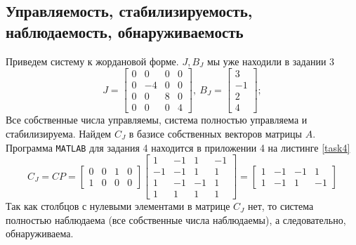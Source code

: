 \documentclass[a4paper, 12pt]{article}
\begin{document}
    \subsection{Управляемость, стабилизируемость, наблюдаемость, обнаруживаемость}
    Приведем систему к жордановой форме. $J,B_J$ мы уже находили в задании 3
    $$
    J=\begin{bmatrix}
        0     &0     &0     &0\\
        0    &-4     &0     &0\\
        0     &0     &8     &0\\
        0     &0     &0     &4
        \end{bmatrix},\ B_J=\begin{bmatrix}
            3\\
            -1\\
             2\\
             4
        \end{bmatrix};
    $$
    Все собственные числа управляемы, система полностью управляема и стабилизируема.
    Найдем $C_J$ в базисе собственных векторов матрицы $A$. Программа \texttt{MATLAB}
    для задания 4 находится в приложении 4 на листинге \ref{task4}
    $$
        C_J=CP=\begin{bmatrix}
            0 &0 &1 &0\\
            1 &0 &0 &0
        \end{bmatrix}\begin{bmatrix}
            1    &-1     &1    &-1\\
            -1    &-1     &1     &1\\
             1    &-1    &-1     &1\\
             1     &1     &1     &1
            \end{bmatrix}=\begin{bmatrix}
                1    &-1    &-1     &1\\
     1    &-1     &1    &-1
            \end{bmatrix}
    $$
    Так как столбцов с нулевыми элементами в матрице $C_J$ нет, то система полностью наблюдаема (все собственные числа наблюдаемы),
    а следовательно, обнаруживаема.
\end{document}
